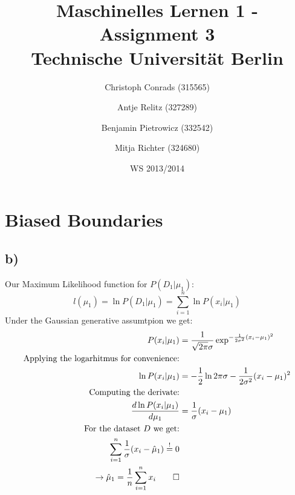 \documentclass[paper=a4,fontsize=10pt,DIV11,BCOR10mm]{scrartcl}
\begin{document}
\title{Maschinelles Lernen 1 - Assignment 3\\
\small{Technische Universität Berlin}}


\author{\small{Christoph Conrads (315565)}\and \small{Antje Relitz (327289)}  \and \small{Benjamin Pietrowicz (332542)} \and \small{Mitja Richter (324680)} }

\date{WS 2013/2014}

\maketitle



\section{Biased Boundaries}
\subsection*{b)}
	Our Maximum Likelihood function for $P(D_1|\mu_1)$:
	\[
	l(\mu_1) = \ln P(D_1|\mu_1) = \sum_{i=1}^n \ln P(x_i|\mu_1)
	\]
	Under the Gaussian generative assumtpion we get:
	\begin{align*}
		P(x_i|\mu_1) &= \frac{1}{\sqrt{2\pi}\sigma}\exp^{-\frac{1}{2\sigma^2}(x_i-\mu_1)^2}\\
	\text{Applying the logarhitmus for convenience:}&\\
		\ln P(x_i|\mu_1) &=-\frac{1}{2} \ln 2\pi \sigma -\frac{1}{2\sigma^2}(x_i-\mu_1)^2\\
	\text{Computing the derivate:}&\\
		\frac{d \ln P(x_i|\mu_1)}{d \mu_1} &= \frac{1}{\sigma}(x_i- \mu_1)\\
	\text{For the dataset $D$ we get:}&\\
	\sum_{i=1}^n \frac{1}{\sigma}(x_i- \hat{\mu}_1) \stackrel{!}{=} 0\\
	\rightarrow \hat{\mu}_1=\frac{1}{n} \sum_{i=1}^n x_i \qed
	\end{align*}






\end{document}
